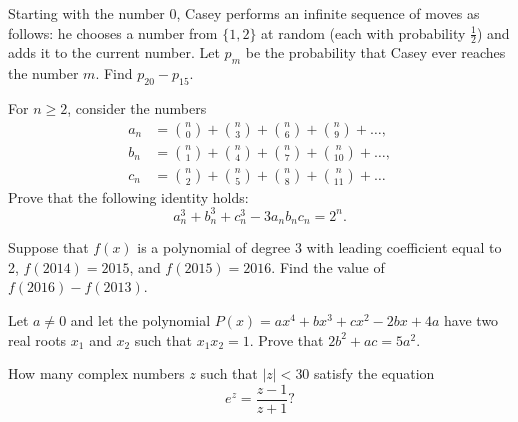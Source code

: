 \documentclass[11pt,twoside]{scrartcl}
\begin{document}
\begin{problem*}
    Starting with the number 0, Casey performs an
    infinite sequence of moves as follows: he chooses a number from $\{1,2\}$ at random (each with probability $\frac{1}{2}$) and adds it to the current number. Let $p_m$ be the probability that Casey ever reaches the number $m$. Find $p_{20} - p_{15}$.
    
\end{problem*}

\begin{problem*}[Handout 4, \#38]
    For $n \ge 2$, consider the numbers
    \begin{align*}
        a_n&= \binom{n}{0} + \binom{n}{3} + \binom{n}{6} + \binom{n}{9} +\ldots, \\
        b_n&= \binom{n}{1} + \binom{n}{4} + \binom{n}{7} + \binom{n}{10} +\ldots, \\
        c_n&= \binom{n}{2} + \binom{n}{5} + \binom{n}{8} + \binom{n}{11} +\ldots
    \end{align*}
    Prove that the following identity holds:
    \[a^3_n +b^3_n +c^3_n - 3a_nb_nc_n =2^n.\]
\end{problem*}

\begin{problem*}[Handout 5, \#38]
    Suppose that $f(x)$ is a polynomial of degree 3 with leading coefficient equal to 2, $f(2014) = 2015$, and
$f (2015) = 2016$. Find the value of $f (2016) - f (2013)$. 
\end{problem*}

\begin{problem*}[Handout 5, \#40]
    Let $a \ne 0$ and let the polynomial $P(x) = ax^4 +bx^3 +cx^2 -2bx+4a$ have two real roots $x_1$ and $x_2$ such that $x_1x_2 = 1$. Prove that $2b^2 + ac = 5a^2$.
\end{problem*}

\begin{problem*}
    How many complex numbers $z$ such that $|z| < 30$ satisfy the equation
    \[e^z = \frac{z-1}{z+1}?\]
\end{problem*}
\end{document}
